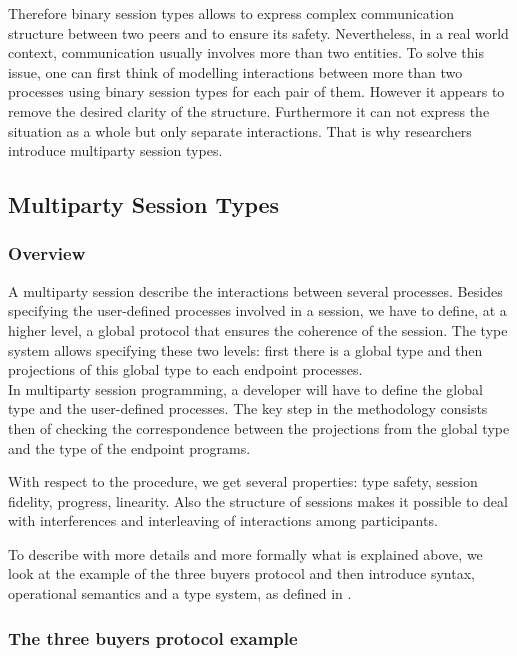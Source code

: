 \documentclass{article}
\begin{document}
Therefore binary session types allows to express complex communication structure between two peers and to ensure its safety. Nevertheless, in a real world context, communication usually involves more than two entities. To solve this issue, one can first think of modelling interactions between more than two processes using binary session types for each pair of them. However it appears to remove the desired clarity of the structure. Furthermore it can not express the situation as a whole but only separate interactions. That is why researchers introduce multiparty session types.

\subsection{Multiparty Session Types}

\subsubsection{Overview}

A multiparty session describe the interactions between several processes. Besides specifying the user-defined processes involved in a session, we have to define, at a higher level, a global protocol that ensures the coherence of the session. The type system allows specifying these two levels: first there is a global type and then projections of this global type to each endpoint processes. \\
In multiparty session programming, a developer will have to define the global type and the user-defined processes. The key step in the methodology consists then of checking the correspondence between the projections from the global type and the type of the endpoint programs.

With respect to the procedure, we get several properties: type safety, session fidelity, progress, linearity. Also the structure of sessions makes it possible to deal with interferences and interleaving of interactions among participants.

To describe with more details and more formally what is explained above, we look at the example of the three buyers protocol and then introduce syntax, operational semantics and a type system, as defined in \cite{coppoglobal}.

\subsubsection{The three buyers protocol example}
\end{document}
